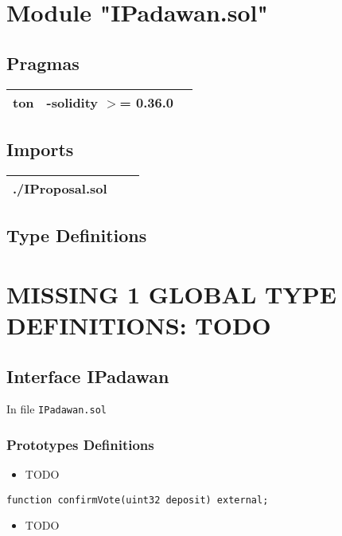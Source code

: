 
\section{Module "IPadawan.sol"}


\subsection{Pragmas}


\noindent\begin{tabular}{|l|l|p{5cm}|}\hline
ton & -solidity $>$= 0.36.0 &\\\hline
\end{tabular}


\subsection{Imports}


\noindent\begin{tabular}{|l|l|p{5cm}|}\hline
./IProposal.sol &\\\hline
\end{tabular}


\subsection{Type Definitions}

\section{MISSING 1 GLOBAL TYPE DEFINITIONS: TODO}

\subsection{Interface IPadawan}

\minitoc

In file {\tt IPadawan.sol}

\subsubsection{Prototypes Definitions}

\begin{itemize}
\item TODO
\end{itemize}

\begin{lstlisting}[firstnumber=14]
    function confirmVote(uint32 deposit) external;
\end{lstlisting}
\begin{itemize}
\item TODO
\end{itemize}

